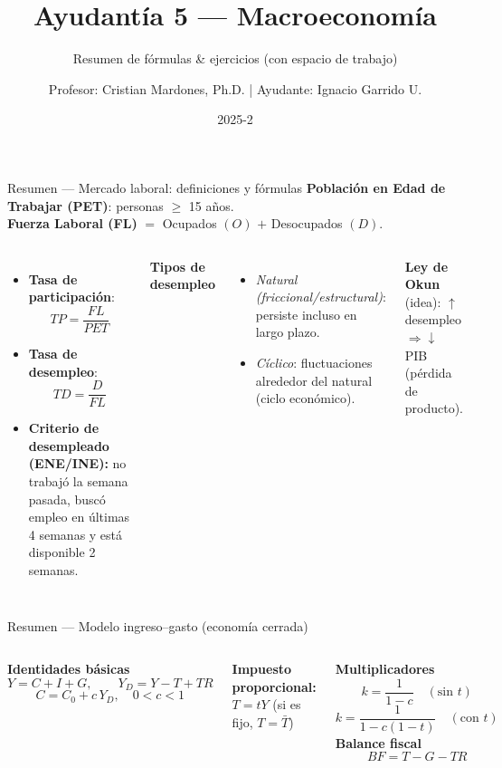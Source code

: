 \documentclass[aspectratio=169,10pt]{beamer}
\title{\textbf{Ayudantía 5 — Macroeconomía}}
\subtitle{Resumen de fórmulas \& ejercicios (con espacio de trabajo)}
\author{Profesor: Cristian Mardones, Ph.D. \quad | \quad Ayudante: Ignacio Garrido U.}
\institute{Facultad de Ingeniería — Depto. de Ingeniería Industrial}
\date{2025-2}
\newcommand{\Yd}{Y_{\!D}}
\begin{document}
\begin{frame}
  \titlepage
\end{frame}

\begin{frame}{Resumen — Mercado laboral: definiciones y fórmulas}
\textbf{Población en Edad de Trabajar (PET)}: personas $\ge$ 15 años. \\
\textbf{Fuerza Laboral (FL)} $=$ Ocupados $(O)$ $+$ Desocupados $(D)$.

\medskip
\begin{columns}[T,onlytextwidth]
\begin{itemize}
  \item \textbf{Tasa de participación}:
  \[
  TP = \frac{FL}{PET}
  \]
  \item \textbf{Tasa de desempleo}:
  \[
  TD = \frac{D}{FL}
  \]
  \item \textbf{Criterio de desempleado (ENE/INE):} no trabajó la semana pasada, buscó empleo en últimas 4 semanas y está disponible 2 semanas.
\end{itemize}

\textbf{Tipos de desempleo}
\begin{itemize}
  \item \textit{Natural (friccional/estructural)}: persiste incluso en largo plazo.
  \item \textit{Cíclico}: fluctuaciones alrededor del natural (ciclo económico).
\end{itemize}
\textbf{Ley de Okun} (idea): $\uparrow$ desempleo $\Rightarrow \downarrow$ PIB (pérdida de producto).
\end{columns}
\end{frame}

\begin{frame}{Resumen — Modelo ingreso–gasto (economía cerrada)}
\begin{columns}[T,onlytextwidth]
\textbf{Identidades básicas}
\[
Y = C + I + G,\qquad \Yd = Y - T + TR
\]
\[
C = C_0 + c\,\Yd,\quad 0<c<1
\]

\textbf{Impuesto proporcional:}\; $T = tY$ \quad (si es fijo, $T=\bar T$)

\textbf{Multiplicadores}
\[
k = \frac{1}{1-c}\quad (\text{sin }t)
\]
\[
k = \frac{1}{1 - c(1-t)}\quad (\text{con }t)
\]
\textbf{Balance fiscal}
\[
BF = T - G - TR
\]
\end{columns}
\end{frame}
\end{document}

